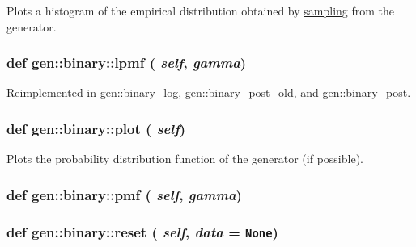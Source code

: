 Plots a histogram of the empirical distribution obtained by \hyperlink{namespacesampling}{sampling} from the generator. 

\hypertarget{classgen_1_1binary_0377b3ffdd44806d72453d0b8ead1758}{
\subsubsection[{lpmf}]{\setlength{\rightskip}{0pt plus 5cm}def gen::binary::lpmf ( {\em self}, \/   {\em gamma})}}
\label{classgen_1_1binary_0377b3ffdd44806d72453d0b8ead1758}




Reimplemented in \hyperlink{classgen_1_1binary__log_aa047299f937b4c89ae2e1fa6b9e2eac}{gen::binary\_\-log}, \hyperlink{classgen_1_1binary__post__old_4a2b39c9d4d59a01f64f0f593f5034c3}{gen::binary\_\-post\_\-old}, and \hyperlink{classgen_1_1binary__post_2ad20ce2b2b31381d879c8f83559f771}{gen::binary\_\-post}.\hypertarget{classgen_1_1binary_07a67826e434eeb49aaef326d2e41805}{
\subsubsection[{plot}]{\setlength{\rightskip}{0pt plus 5cm}def gen::binary::plot ( {\em self})}}
\label{classgen_1_1binary_07a67826e434eeb49aaef326d2e41805}


Plots the probability distribution function of the generator (if possible). 

\hypertarget{classgen_1_1binary_2a0d104e1d99419fa3c5e7bf5db96e9e}{
\subsubsection[{pmf}]{\setlength{\rightskip}{0pt plus 5cm}def gen::binary::pmf ( {\em self}, \/   {\em gamma})}}
\label{classgen_1_1binary_2a0d104e1d99419fa3c5e7bf5db96e9e}


\hypertarget{classgen_1_1binary_8fd0271b697cfd36fc72a5e3dadbd908}{
\subsubsection[{reset}]{\setlength{\rightskip}{0pt plus 5cm}def gen::binary::reset ( {\em self}, \/   {\em data} = {\tt None})}}
\label{classgen_1_1binary_8fd0271b697cfd36fc72a5e3dadbd908}


